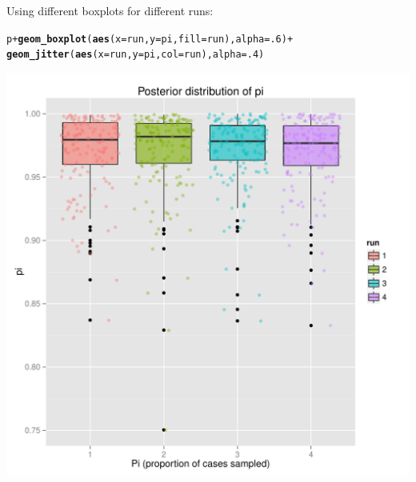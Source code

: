 \documentclass{article}\usepackage[]{graphicx}\usepackage[]{color}
\makeatletter
\newcommand{\hlnum}[1]{\textcolor[rgb]{0.686,0.059,0.569}{#1}}%
\newcommand{\hlopt}[1]{\textcolor[rgb]{0,0,0}{#1}}%
\newcommand{\hlstd}[1]{\textcolor[rgb]{0.345,0.345,0.345}{#1}}%
\newcommand{\hlkwc}[1]{\textcolor[rgb]{0.333,0.667,0.333}{#1}}%
\newcommand{\hlkwd}[1]{\textcolor[rgb]{0.737,0.353,0.396}{\textbf{#1}}}%
\newenvironment{kframe}{%
 \def\at@end@of@kframe{}%
 \ifinner\ifhmode%
  \def\at@end@of@kframe{\end{minipage}}%
  \begin{minipage}{\columnwidth}%
 \fi\fi%
 \def\FrameCommand##1{\hskip\@totalleftmargin \hskip-\fboxsep
 \colorbox{shadecolor}{##1}\hskip-\fboxsep
     \hskip-\linewidth \hskip-\@totalleftmargin \hskip\columnwidth}%
 \MakeFramed {\advance\hsize-\width
   \@totalleftmargin\z@ \linewidth\hsize
   \@setminipage}}%
 {\par\unskip\endMakeFramed%
 \at@end@of@kframe}
\newenvironment{knitrout}{}{} %
\makeatother
\begin{document}
Using different boxplots for different runs:
\begin{knitrout}
\color{fgcolor}\begin{kframe}
\begin{alltt}
\hlstd{p} \hlopt{+} \hlkwd{geom_boxplot}\hlstd{(}\hlkwd{aes}\hlstd{(}\hlkwc{x}\hlstd{=run,} \hlkwc{y}\hlstd{=pi,} \hlkwc{fill}\hlstd{=run),}\hlkwc{alpha}\hlstd{=}\hlnum{.6}\hlstd{)} \hlopt{+}
    \hlkwd{geom_jitter}\hlstd{(}\hlkwd{aes}\hlstd{(}\hlkwc{x}\hlstd{=run,} \hlkwc{y}\hlstd{=pi,} \hlkwc{col}\hlstd{=run),}\hlkwc{alpha}\hlstd{=}\hlnum{.4}\hlstd{)}
\end{alltt}
\end{kframe}

{\centering \includegraphics[width=.6\textwidth]{figs/unnamed-chunk-40} 

}



\end{knitrout}
\end{document}
